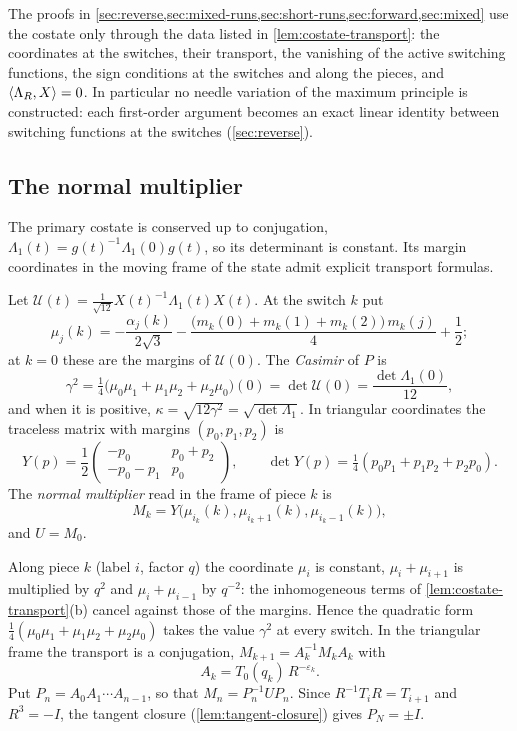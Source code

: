 The proofs in \cref{sec:reverse,sec:mixed-runs,sec:short-runs,sec:forward,sec:mixed} use the
costate only through the data listed in \cref{lem:costate-transport}: the coordinates at the
switches, their transport, the vanishing of the active switching functions, the sign conditions
at the switches and along the pieces, and $\langle \Lambda_R,X\rangle=0$. In particular no needle
variation of the maximum principle is constructed: each first-order argument becomes an exact
linear identity between switching functions at the switches (\cref{sec:reverse}).

\subsection{The normal multiplier}\label{sec:per-multiplier}

The primary costate is conserved up to conjugation, $\Lambda_1(t)=g(t)^{-1}\Lambda_1(0)g(t)$, so
its determinant is constant. Its margin coordinates in the moving frame of the state admit
explicit transport formulas.

\begin{definition}\label{def:normal-multiplier}
Let $\mathcal U(t)=\frac{1}{\sqrt{12}}X(t)^{-1}\Lambda_1(t)X(t)$. At the switch $k$ put
\[
  \mu_j(k)=-\frac{\alpha_j(k)}{2\sqrt3}-\frac{\bigl(m_k(0)+m_k(1)+m_k(2)\bigr)\,m_k(j)}{4}+\frac12;
\]
at $k=0$ these are the margins of $\mathcal U(0)$. The \emph{Casimir} of $P$ is
\[
  \gamma^2=\tfrac14\bigl(\mu_0\mu_1+\mu_1\mu_2+\mu_2\mu_0\bigr)(0)=\det\mathcal U(0)
  =\frac{\det\Lambda_1(0)}{12},
\]
and when it is positive, $\kappa=\sqrt{12\gamma^2}=\sqrt{\det\Lambda_1}$. In triangular coordinates the traceless matrix with margins
$(p_0,p_1,p_2)$ is
\[
  Y(p)=\frac12\begin{pmatrix}-p_0&p_0+p_2\\-p_0-p_1&p_0\end{pmatrix},\qquad
  \det Y(p)=\tfrac14(p_0p_1+p_1p_2+p_2p_0).
\]
The \emph{normal multiplier} read in the frame of piece $k$ is
\[
  M_k=Y\bigl(\mu_{i_k}(k),\mu_{i_k+1}(k),\mu_{i_k-1}(k)\bigr),
\]
and $U=M_0$.
\end{definition}

Along piece $k$ (label $i$, factor $q$) the coordinate $\mu_i$ is constant, $\mu_i+\mu_{i+1}$ is
multiplied by $q^2$ and $\mu_i+\mu_{i-1}$ by $q^{-2}$: the inhomogeneous terms of
\cref{lem:costate-transport}(b) cancel against those of the margins. Hence the quadratic form
$\frac14(\mu_0\mu_1+\mu_1\mu_2+\mu_2\mu_0)$ takes the value $\gamma^2$ at every switch. In the triangular frame the transport is a conjugation,
$M_{k+1}=A_k^{-1}M_kA_k$ with
\[
  A_k=T_0(q_k)\,R^{-\varepsilon_k}.
\]
Put $P_n=A_0A_1\cdots A_{n-1}$, so
that $M_n=P_n^{-1}UP_n$. Since $R^{-1}T_iR=T_{i+1}$ and $R^3=-I$, the tangent closure
(\cref{lem:tangent-closure}) gives $P_N=\pm I$.

